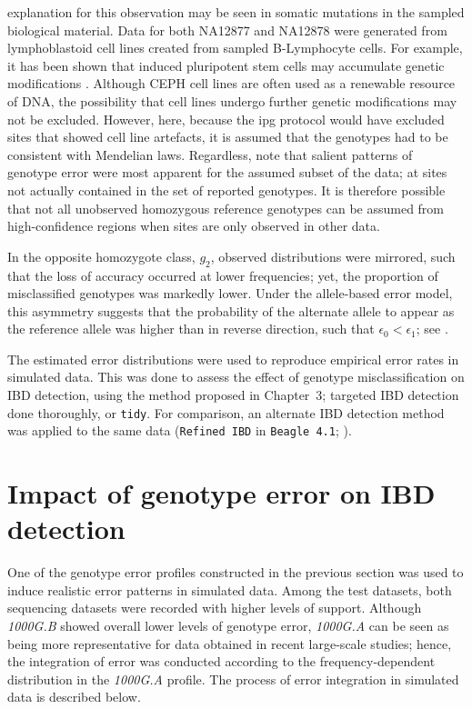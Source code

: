  explanation for this observation may be seen in somatic mutations in the sampled biological material.
Data for both \textsf{NA12877} and \textsf{NA12878} were generated from lymphoblastoid cell lines created from sampled B-Lymphocyte cells.
For example, it has been shown that induced pluripotent stem cells may accumulate genetic modifications \citep{Gore:2011id}.
Although CEPH cell lines are often used as a renewable resource of DNA, the possibility that cell lines undergo further genetic modifications may not be excluded.
However, here, because the \gls{ipg} protocol would have excluded sites that showed cell line artefacts, it is assumed that the genotypes had to be consistent with Mendelian laws.
Regardless, note that salient patterns of genotype error were most apparent for the assumed subset of the data; \ie at sites not actually contained in the set of reported genotypes.
It is therefore possible that not all unobserved homozygous reference genotypes can be assumed from high-confidence regions when sites are only observed in other data.


In the opposite homozygote class, $g_2$, observed distributions were mirrored, such that the loss of accuracy occurred at lower frequencies; yet, the proportion of misclassified genotypes was markedly lower.
Under the allele-based error model, this asymmetry suggests that the probability of the alternate allele to appear as the reference allele was higher than in reverse direction, such that ${\epsilon_0 < \epsilon_1}$; see .


The estimated error distributions were used to reproduce empirical error rates in simulated data.
This was done to assess the effect of genotype misclassification on IBD detection, using the method proposed in Chapter~3; \ie targeted IBD detection done thoroughly, or \texttt{tidy}.
For comparison, an alternate IBD detection method was applied to the same data (\texttt{Refined\,IBD} in \texttt{Beagle\,4.1}; \citealt{Browning:2013eh}).







%
\section{Impact of genotype error on IBD detection}
\label{sec:impact_error_data}
%

One of the genotype error profiles constructed in the previous section was used to induce realistic error patterns in simulated data.
Among the  test datasets, both sequencing datasets were recorded with higher levels of support.
Although \emph{1000G.B} showed overall lower levels of genotype error, \emph{1000G.A} can be seen as being more representative for data obtained in recent large-scale studies; hence, the integration of error was conducted according to the frequency-dependent  distribution in the \emph{1000G.A} profile.
The process of error integration in simulated data is described below.


